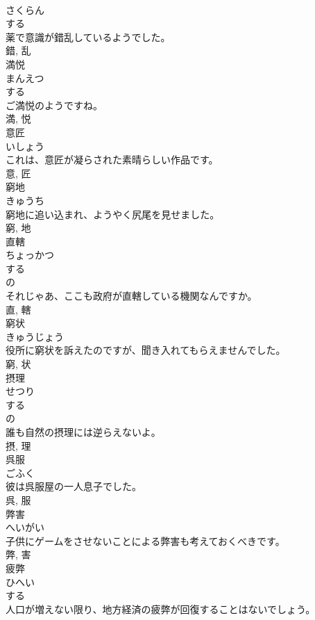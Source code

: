 \documentclass[8pt]{extreport}
\begin{document}
\begin{CJK}{UTF8}{min}
\\	さくらん	
\\	する 
\\	薬で意識が錯乱しているようでした。	
\\	錯, 乱	
\\	満悦	
\\	まんえつ	
\\	する 
\\	ご満悦のようですね。	
\\	満, 悦	
\\	意匠	
\\	いしょう	
\\	これは、意匠が凝らされた素晴らしい作品です。	
\\	意, 匠	
\\	窮地	
\\	きゅうち	
\\	窮地に追い込まれ、ようやく尻尾を見せました。	
\\	窮, 地	
\\	直轄	
\\	ちょっかつ	
\\	する 
\\	の 
\\	それじゃあ、ここも政府が直轄している機関なんですか。	
\\	直, 轄	
\\	窮状	
\\	きゅうじょう	
\\	役所に窮状を訴えたのですが、聞き入れてもらえませんでした。	
\\	窮, 状	
\\	摂理	
\\	せつり	
\\	する 
\\	の 
\\	誰も自然の摂理には逆らえないよ。	
\\	摂, 理	
\\	呉服	
\\	ごふく	
\\	彼は呉服屋の一人息子でした。	
\\	呉, 服	
\\	弊害	
\\	へいがい	
\\	子供にゲームをさせないことによる弊害も考えておくべきです。	
\\	弊, 害	
\\	疲弊	
\\	ひへい	
\\	する 
\\	人口が増えない限り、地方経済の疲弊が回復することはないでしょう。	

\end{CJK}
\end{document}

